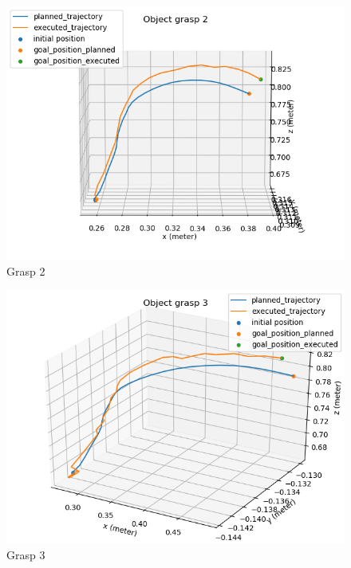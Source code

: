 \begin{figure}[H]
	\centering
	\includegraphics[scale=0.7]{images/HSR_4/2.png}
	\caption{Grasp 2}
	\label{fig:grasp_2}
\end{figure}

\begin{figure}[H]
	\centering
	\includegraphics[scale=0.7]{images/HSR_4/3.png}
	\caption{Grasp 3}
	\label{fig:grasp_3}
\end{figure}

